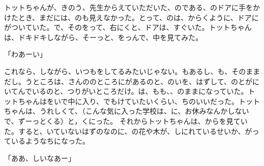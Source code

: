 トットちゃんが、きのう、先生からえていただいた、のである、のドアに手をかけたとき、まだには、のも見えなかった。とって、のは、からくように、ドアにがついていた。で、そのをって、右にくと、ドアは、すぐいた。トットちゃんは、ドキドキしながら、そーっと、をっんで、中を見てみた。

「わあーい」

これなら、しながら、いつもをしてるみたいじゃない。もあるし、も、そのままだし。うところは、さんののところにがあるのと、のいを、はずして、のとがにいてんでいるのと、つりがいところだけ。は、もも、、のままになっていた。トットちゃんはをいで中に入り、でもけていたいくらい、ちのいいだった。トットちゃんは、うれしくて、（こんな気に入った学校は、に、お休みなんかしないで、ずーっとくる）と，くにった。 それからトットちゃんは、からを見ていた。すると、いていないはずのなのに、の花や木が、しにれているせいか、がっているようなちになった。

「ああ、しいなあー」

